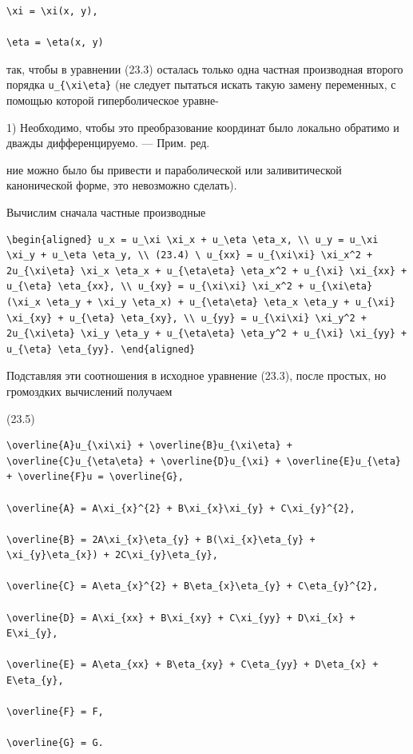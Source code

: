 \documentclass[
  ukrainian,
]{article}
\begin{document}
\begin{verbatim}
\xi = \xi(x, y),

\eta = \eta(x, y)
\end{verbatim}

так, чтобы в уравнении (23.3) осталась только одна частная производная
второго порядка \texttt{u\_\{\textbackslash{}xi\textbackslash{}eta\}}
(не следует пытаться искать такую замену переменных, с помощью которой
гиперболическое уравне-

1) Необходимо, чтобы это преобразование координат было локально обратимо
и дважды дифференцируемо. --- Прим. ред.

ние можно было бы привести и параболической или заливитической
канонической форме, это невозможно сделать).

Вычислим сначала частные производные

\begin{verbatim}
\begin{aligned} u_x = u_\xi \xi_x + u_\eta \eta_x, \\ u_y = u_\xi \xi_y + u_\eta \eta_y, \\ (23.4) \ u_{xx} = u_{\xi\xi} \xi_x^2 + 2u_{\xi\eta} \xi_x \eta_x + u_{\eta\eta} \eta_x^2 + u_{\xi} \xi_{xx} + u_{\eta} \eta_{xx}, \\ u_{xy} = u_{\xi\xi} \xi_x^2 + u_{\xi\eta} (\xi_x \eta_y + \xi_y \eta_x) + u_{\eta\eta} \eta_x \eta_y + u_{\xi} \xi_{xy} + u_{\eta} \eta_{xy}, \\ u_{yy} = u_{\xi\xi} \xi_y^2 + 2u_{\xi\eta} \xi_y \eta_y + u_{\eta\eta} \eta_y^2 + u_{\xi} \xi_{yy} + u_{\eta} \eta_{yy}. \end{aligned}
\end{verbatim}

Подставляя эти соотношения в исходное уравнение (23.3), после простых,
но громоздких вычислений получаем

(23.5)

\begin{verbatim}
\overline{A}u_{\xi\xi} + \overline{B}u_{\xi\eta} + \overline{C}u_{\eta\eta} + \overline{D}u_{\xi} + \overline{E}u_{\eta} + \overline{F}u = \overline{G},

\overline{A} = A\xi_{x}^{2} + B\xi_{x}\xi_{y} + C\xi_{y}^{2},

\overline{B} = 2A\xi_{x}\eta_{y} + B(\xi_{x}\eta_{y} + \xi_{y}\eta_{x}) + 2C\xi_{y}\eta_{y},

\overline{C} = A\eta_{x}^{2} + B\eta_{x}\eta_{y} + C\eta_{y}^{2},

\overline{D} = A\xi_{xx} + B\xi_{xy} + C\xi_{yy} + D\xi_{x} + E\xi_{y},

\overline{E} = A\eta_{xx} + B\eta_{xy} + C\eta_{yy} + D\eta_{x} + E\eta_{y},

\overline{F} = F,

\overline{G} = G.
\end{verbatim}
\end{document}
